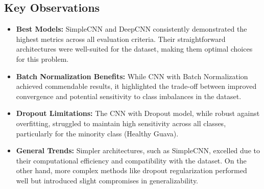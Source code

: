 \documentclass[conference]{IEEEtran}
\begin{document}
\subsection{Key Observations}

\begin{itemize}
    \item \textbf{Best Models:} SimpleCNN and DeepCNN consistently demonstrated the highest metrics across all evaluation criteria. Their straightforward architectures were well-suited for the dataset, making them optimal choices for this problem.

    \item \textbf{Batch Normalization Benefits:} While CNN with Batch Normalization achieved commendable results, it highlighted the trade-off between improved convergence and potential sensitivity to class imbalances in the dataset.

    \item \textbf{Dropout Limitations:} The CNN with Dropout model, while robust against overfitting, struggled to maintain high sensitivity across all classes, particularly for the minority class (Healthy Guava).

    \item \textbf{General Trends:} Simpler architectures, such as SimpleCNN, excelled due to their computational efficiency and compatibility with the dataset. On the other hand, more complex methods like dropout regularization performed well but introduced slight compromises in generalizability.
\end{itemize}
\end{document}

